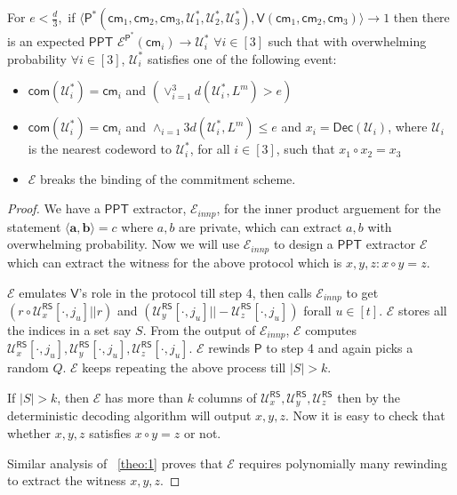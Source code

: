 \documentclass[runningheads]{llncs}
\newcommand{\innp}[2]{\langle #1,#2\rangle}
\def\ppt{\mathsf{PPT}}
\def\extrac{\mathcal{E}}
\def\prover{\mathsf{P}}
\def\verifier{\mathsf{V}}
\def\RS{\mathsf{RS}} %
\def\cm{\mathsf{cm}} %
\def\com{\mathsf{com}} %
\def\oracle{\mathcal{U}^{\RS}}
\def\dec{\mathsf{Dec}}
\def\calU{\mathcal{U}}
\begin{document}
	\begin{theorem}
		For $ e < \frac{d}{3}, $ if $\innp{\prover^*(\cm_1, \cm_2, \cm_3 , \calU^*_1	, \calU^*_2, \calU^*_3)}{\verifier(\cm_1, \cm_2, \cm_3)} \rightarrow 1$ then there is an expected $\ppt$  $\extrac^{\prover^*}(\cm_i)\rightarrow \calU^*_i$ $\forall i\in [3]$ such that with overwhelming probability $\forall i \in [3]$, $\calU^*_i$ satisfies one of the following event: 
		\begin{itemize}
			\item $\com(\calU^*_i) = \cm_i$ and $(\vee_{i=1}^{3} d(\calU^*_i, L^m)> e)$ 
			\item $\com(\calU^*_i) = \cm_i$ and $\wedge_{i=1}{3} d(\calU^*_i,L^m)\leq e$ and $ x_i = \dec(\calU_i)$, where $\calU_i$ is the nearest codeword to $\calU^*_i$, for all $i\in [3]$, such that $x_1 \circ x_2 = x_3$
			\item $\extrac$ breaks the binding of the commitment scheme.
		\end{itemize} 
	
	\end{theorem}
	\begin{proof}
	We have a $\ppt$ extractor, $\extrac_{innp}$, for the inner product arguement for the statement $\innp{\bm{a}}{\bm{b}}=c$ where $a,b$ are private, which can extract $a, b$ with overwhelming probability. Now we will use $\extrac_{innp}$ to design a $\ppt$ extractor $\extrac$ which can extract the witness for the above protocol which is $x,y,z : x \circ y = z$.
	
	 $\extrac$ emulates $\verifier$'s role in the protocol till step 4, then calls $\extrac_{innp}$ to get $(r\circ \oracle_x[\cdot,j_u]||r)$ and $(\oracle_y[\cdot,j_u]||-\oracle_z[\cdot,j_u])$ forall $u\in [t]$. $\extrac$ stores all the indices in a set say $S$. From the output of $\extrac_{innp}$, $\extrac$ computes $\oracle_x[\cdot,j_u], \oracle_y[\cdot,j_u],\oracle_z[\cdot,j_u]$. $\extrac$ rewinds $\prover$ to step 4 and again picks a random $Q$. $\extrac$ keeps repeating the above process till $|S|>k$.
	 
	 If $|S|>k$, then $\extrac$ has more than $k$ columns of $\oracle_x, \oracle_y, \oracle_z$ then by the deterministic decoding algorithm will output $x, y, z$. Now it is easy to check that whether $x, y, z$ satisfies $x \circ y =z$ or not. 
	 
	 Similar analysis of ~\ref{theo:1} proves that $\extrac$ requires polynomially many rewinding to extract the witness $x, y, z$.
	\end{proof}
	
\end{document}

